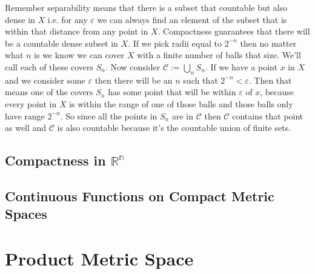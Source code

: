 \documentclass[oneside]{book}
\begin{document}
Remember separability means that there is a subset that countable but also dense in $X$ i.e. for any $\varepsilon$ we can always find an element of the subset that is within that distance from any point in $X$. Compactness guarantees that there will be a countable dense subset in $X$. If we pick radii equal to $2^{-n}$ then no matter what $n$ is we know we can cover $X$ with a finite number of balls that size. We'll call each of these covers $S_n$. Now consider $\mathcal{C} := \bigcup_{n} S_n$. If we have a point $x$ in $X$ and we consider some $\varepsilon$ then there will be an $n$ such that $2^{-n} < \varepsilon$. Then that means one of the covers $S_n$ has some point that will be within $\varepsilon$ of $x$, because every point in $X$ is within the range of one of those balls and those balls only have range $2^{-n}$. So since all the points in $S_n$ are in $\mathcal{C}$ then $\mathcal{C}$ contains that point as well and $\mathcal{C}$ is also countable because it's the countable union of finite sets.

\subsection{Compactness in $\mathbb{R^n}$}

\subsection{Continuous Functions on Compact Metric Spaces}

\section{Product Metric Space}
\end{document}
